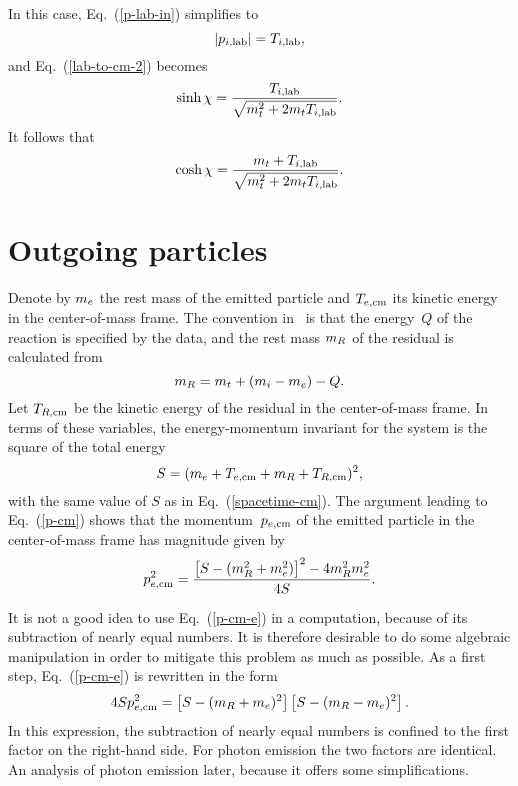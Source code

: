 {In this case, Eq.~(\ref{p-lab-in}) simplifies to
$$
  | p_{i,\textrm{lab}} |  =  T_{i,\textrm{lab}},
$$
and Eq.~(\ref{lab-to-cm-2}) becomes
$$
  \sinh \chi = \frac{ T_{i,\textrm{lab}}}
    {\sqrt{ m_t^2 + 2 m_t T_{i,\textrm{lab}} }}.
$$
It follows that
$$
  \cosh \chi = \frac{ m_t + T_{i,\textrm{lab}}}
    {\sqrt{ m_t^2 + 2 m_t T_{i,\textrm{lab}} }}.
$$



\section{Outgoing particles}
Denote by $m_e$ the rest mass of the
emitted particle and
$T_{e,\textrm{cm}}$ its kinetic energy in the center-of-mass frame.
The convention in \xendl\ is that the energy~$Q$ of the reaction
is specified by the data, and the rest mass  $m_R$ of the residual
is calculated from
\begin{equation}
  m_R = m_t + ( m_i - m_e ) - Q.
 \label{Q-2body}
\end{equation}
Let $T_{R,\textrm{cm}}$ be the kinetic energy of the residual in the center-of-mass frame.
In terms of these variables, the energy-momentum invariant
for the system is the square of the total energy
$$
    S = (m_e + T_{e,\textrm{cm}} + m_R + T_{R,\textrm{cm}})^2,
$$
with the same value of $S$ as in Eq.~(\ref{spacetime-cm}).
The argument leading to Eq.~(\ref{p-cm}) shows that the
momentum~$p_{e,\textrm{cm}}$ of the emitted particle in the center-of-mass frame
has magnitude given by
\begin{equation}
  p_{e,\textrm{cm}}^2 = \frac{ \left[S - (m_R^2 + m_e^2)\right]^2 -
                 4 m_R^2 m_e^2 }
                {4 S }.
  \label{p-cm-e}
\end{equation}

It is not a good idea to use Eq.~(\ref{p-cm-e}) in a
computation, because of its subtraction of nearly equal
numbers.  It is therefore desirable to do some algebraic manipulation
in order to mitigate this problem as much as possible.
As a first step, Eq.~(\ref{p-cm-e}) is rewritten in the
form
\begin{equation}
  4 S p_{e,\textrm{cm}}^2 = \left[S - (m_R + m_e)^2\right]
              \left[S - (m_R - m_e)^2\right].
 \label{p-cm-e-1}
\end{equation}
In this expression, the subtraction of nearly equal
numbers is confined to the first factor on the right-hand
side.  For photon emission the two factors are identical.
An analysis of photon emission later, because it offers some
simplifications.

}
